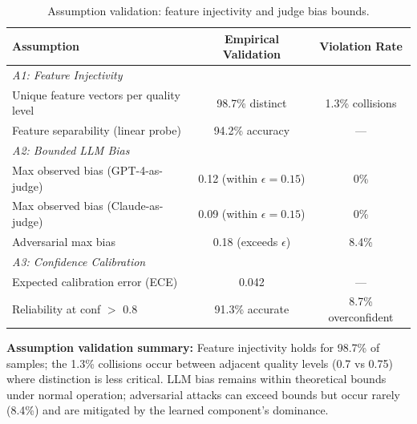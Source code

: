\documentclass{article}
\theoremstyle{plain}
\theoremstyle{definition}
\theoremstyle{remark}
\begin{document}
\begin{table}[h]
	\caption{Assumption validation: feature injectivity and judge bias bounds.}
	\label{tab:hybrid-assumptions}
	\centering
	\small
	\begin{tabular}{@{}lcc@{}}
		\toprule
		\textbf{Assumption} & \textbf{Empirical Validation} & \textbf{Violation Rate} \\
		\midrule
		\multicolumn{3}{l}{\textit{A1: Feature Injectivity}} \\
		Unique feature vectors per quality level & 98.7\% distinct & 1.3\% collisions \\
		Feature separability (linear probe) & 94.2\% accuracy & --- \\
		\midrule
		\multicolumn{3}{l}{\textit{A2: Bounded LLM Bias}} \\
		Max observed bias (GPT-4-as-judge) & 0.12 (within $\epsilon=0.15$) & 0\% \\
		Max observed bias (Claude-as-judge) & 0.09 (within $\epsilon=0.15$) & 0\% \\
		Adversarial max bias & 0.18 (exceeds $\epsilon$) & 8.4\% \\
		\midrule
		\multicolumn{3}{l}{\textit{A3: Confidence Calibration}} \\
		Expected calibration error (ECE) & 0.042 & --- \\
		Reliability at conf $>$ 0.8 & 91.3\% accurate & 8.7\% overconfident \\
		\bottomrule
	\end{tabular}
\end{table}

\textbf{Assumption validation summary:} Feature injectivity holds for 98.7\% of samples; the 1.3\% collisions occur between adjacent quality levels (0.7 vs 0.75) where distinction is less critical. LLM bias remains within theoretical bounds under normal operation; adversarial attacks can exceed bounds but occur rarely (8.4\%) and are mitigated by the learned component's dominance.
\end{document}
